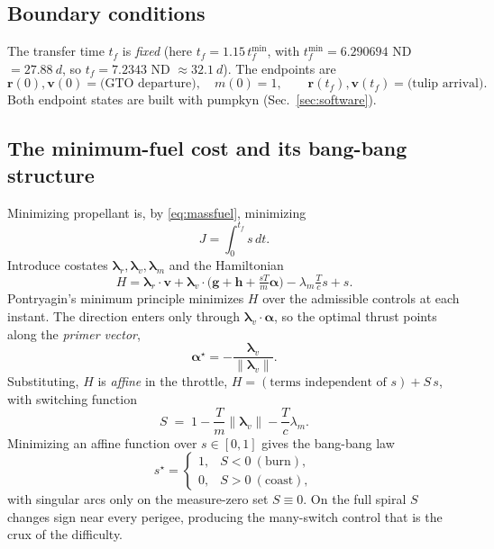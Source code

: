 \documentclass[11pt]{article}
\newcommand{\vv}[1]{\boldsymbol{#1}}
\newcommand{\rvec}{\vv{r}}
\newcommand{\vvec}{\vv{v}}
\newcommand{\lam}{\vv{\lambda}}
\newcommand{\dt}{\,dt}
\begin{document}
\subsection{Boundary conditions}
The transfer time $t_f$ is \emph{fixed} (here $t_f=1.15\,t_f^{\min}$, with
$t_f^{\min}=6.290694$ ND $=\SI{27.88}{d}$, so $t_f=7.2343$ ND $\approx
\SI{32.1}{d}$). The endpoints are
\begin{equation}
\rvec(0),\vvec(0)=\text{(GTO departure)},\quad m(0)=1,\qquad
\rvec(t_f),\vvec(t_f)=\text{(tulip arrival)} .
\end{equation}
Both endpoint states are built with pumpkyn (Sec.~\ref{sec:software}).

\subsection{The minimum-fuel cost and its bang-bang structure}
Minimizing propellant is, by \eqref{eq:massfuel}, minimizing
\begin{equation}
J=\int_0^{t_f}\! s\dt .
\label{eq:Jfuel}
\end{equation}
Introduce costates $\lam_r,\lam_v,\lam_m$ and the Hamiltonian
\begin{equation}
H=\lam_r\!\cdot\!\vvec+\lam_v\!\cdot\!\Big(\vv g+\vv h+\tfrac{sT}{m}\vv\alpha\Big)
-\lambda_m\tfrac{T}{c}s+s .
\end{equation}
Pontryagin's minimum principle minimizes $H$ over the admissible controls at
each instant. The direction enters only through $\lam_v\!\cdot\!\vv\alpha$, so
the optimal thrust points along the \emph{primer vector},
\begin{equation}
\vv\alpha^\star=-\frac{\lam_v}{\lVert\lam_v\rVert}.
\end{equation}
Substituting, $H$ is \emph{affine} in the throttle,
$H=(\text{terms independent of }s)+S\,s$, with switching function
\begin{equation}
S \;=\; 1-\frac{T}{m}\lVert\lam_v\rVert-\frac{T}{c}\lambda_m .
\label{eq:switch}
\end{equation}
Minimizing an affine function over $s\in[0,1]$ gives the bang-bang law
\begin{equation}
s^\star=\begin{cases}1,& S<0\ (\text{burn}),\\[2pt]0,& S>0\ (\text{coast}),\end{cases}
\label{eq:bangbang}
\end{equation}
with singular arcs only on the measure-zero set $S\equiv0$. On the full spiral
$S$ changes sign near every perigee, producing the many-switch control that is
the crux of the difficulty.
\end{document}

